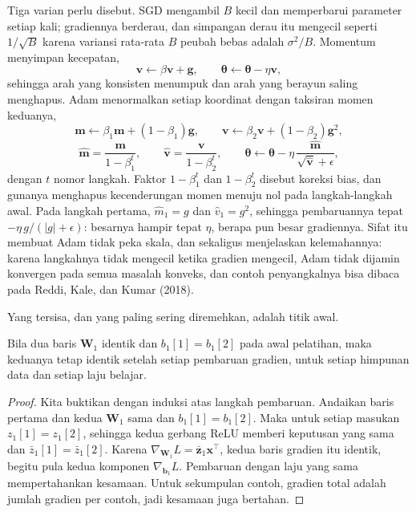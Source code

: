 
Tiga varian perlu disebut. SGD mengambil $B$ kecil dan
memperbarui parameter setiap kali; gradiennya berderau, dan simpangan derau itu mengecil
seperti $1/\sqrt{B}$ karena variansi rata-rata $B$ peubah bebas adalah $\sigma^{2}/B$.
Momentum menyimpan kecepatan,
\[
  \mathbf{v}\leftarrow\beta\mathbf{v}+\mathbf{g},\qquad
  \boldsymbol{\theta}\leftarrow\boldsymbol{\theta}-\eta\mathbf{v},
\]
sehingga arah yang konsisten menumpuk dan arah yang berayun saling menghapus. Adam
menormalkan setiap koordinat dengan taksiran momen keduanya,
\[
  \mathbf{m}\leftarrow\beta_{1}\mathbf{m}+(1-\beta_{1})\mathbf{g},\qquad
  \mathbf{v}\leftarrow\beta_{2}\mathbf{v}+(1-\beta_{2})\mathbf{g}^{2},
\]
\[
  \hat{\mathbf{m}}=\frac{\mathbf{m}}{1-\beta_{1}^{t}},\qquad
  \hat{\mathbf{v}}=\frac{\mathbf{v}}{1-\beta_{2}^{t}},\qquad
  \boldsymbol{\theta}\leftarrow\boldsymbol{\theta}
  -\eta\,\frac{\hat{\mathbf{m}}}{\sqrt{\hat{\mathbf{v}}}+\epsilon},
\]
dengan $t$ nomor langkah. Faktor $1-\beta_{1}^{t}$ dan $1-\beta_{2}^{t}$ disebut koreksi
bias, dan gunanya menghapus kecenderungan momen menuju nol pada langkah-langkah awal. Pada
langkah pertama, $\hat{m}_{1}=g$ dan $\hat{v}_{1}=g^{2}$, sehingga pembaruannya tepat
$-\eta\,g/(\lvert g\rvert+\epsilon)$: besarnya hampir tepat $\eta$, berapa pun besar
gradiennya. Sifat itu membuat Adam tidak peka skala, dan sekaligus menjelaskan kelemahannya:
karena langkahnya tidak mengecil ketika gradien mengecil, Adam tidak dijamin konvergen pada
semua masalah konveks, dan contoh penyangkalnya bisa dibaca pada Reddi, Kale, dan Kumar
(2018).

Yang tersisa, dan yang paling sering diremehkan, adalah titik awal.

\begin{proposisi}
Bila dua baris $\mathbf{W}_{1}$ identik dan $b_{1}[1]=b_{1}[2]$ pada awal pelatihan, maka
keduanya tetap identik setelah setiap pembaruan gradien, untuk setiap himpunan data dan
setiap laju belajar.
\end{proposisi}

\begin{proof}
Kita buktikan dengan induksi atas langkah pembaruan. Andaikan baris pertama dan kedua
$\mathbf{W}_{1}$ sama dan $b_{1}[1]=b_{1}[2]$. Maka untuk setiap masukan
$z_{1}[1]=z_{1}[2]$, sehingga kedua gerbang ReLU memberi keputusan yang sama dan
$\bar{z}_{1}[1]=\bar{z}_{1}[2]$. Karena
$\nabla_{\mathbf{W}_{1}}L=\bar{\mathbf{z}}_{1}\mathbf{x}^{\top}$, kedua baris gradien itu
identik, begitu pula kedua komponen $\nabla_{\mathbf{b}_{1}}L$. Pembaruan dengan laju yang
sama mempertahankan kesamaan. Untuk sekumpulan contoh, gradien total adalah jumlah gradien
per contoh, jadi kesamaan juga bertahan.
\end{proof}


